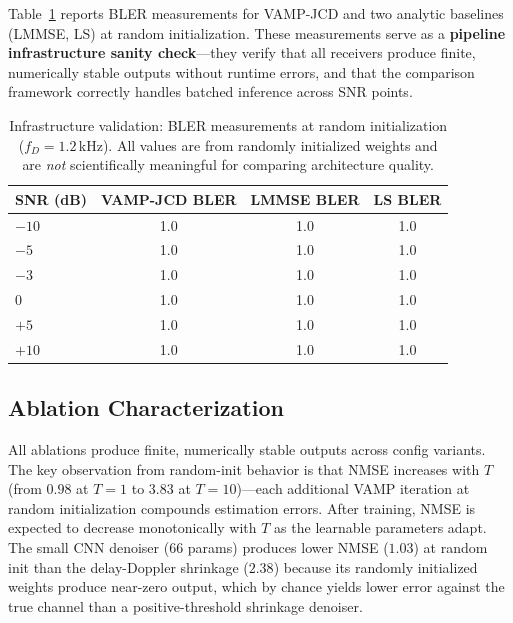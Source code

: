 \documentclass{article}
\begin{document}
Table~\ref{tab:baseline} reports BLER measurements for VAMP-JCD and two analytic baselines (LMMSE, LS) at random initialization. These measurements serve as a \textbf{pipeline infrastructure sanity check}---they verify that all receivers produce finite, numerically stable outputs without runtime errors, and that the comparison framework correctly handles batched inference across SNR points.
\begin{table}[h]
  \centering
  \caption{Infrastructure validation: BLER measurements at random initialization ($f_D = 1.2$\,kHz). All values are from randomly initialized weights and are \emph{not} scientifically meaningful for comparing architecture quality.}
  \label{tab:baseline}
  \begin{tabular}{@{}lccc@{}}
    \toprule
    SNR (dB) & VAMP-JCD BLER & LMMSE BLER & LS BLER \\
    \midrule
    $-10$ & 1.0 & 1.0 & 1.0 \\
    $-5$  & 1.0 & 1.0 & 1.0 \\
    $-3$  & 1.0 & 1.0 & 1.0 \\
    $0$   & 1.0 & 1.0 & 1.0 \\
    $+5$  & 1.0 & 1.0 & 1.0 \\
    $+10$ & 1.0 & 1.0 & 1.0 \\
    \bottomrule
  \end{tabular}
\end{table}

\subsection{Ablation Characterization}

All ablations produce finite, numerically stable outputs across config variants. The key observation from random-init behavior is that NMSE increases with $T$ (from $0.98$ at $T=1$ to $3.83$ at $T=10$)---each additional VAMP iteration at random initialization compounds estimation errors. After training, NMSE is expected to decrease monotonically with $T$ as the learnable parameters adapt. The small CNN denoiser ($66$ params) produces lower NMSE ($1.03$) at random init than the delay-Doppler shrinkage ($2.38$) because its randomly initialized weights produce near-zero output, which by chance yields lower error against the true channel than a positive-threshold shrinkage denoiser.
\end{document}
